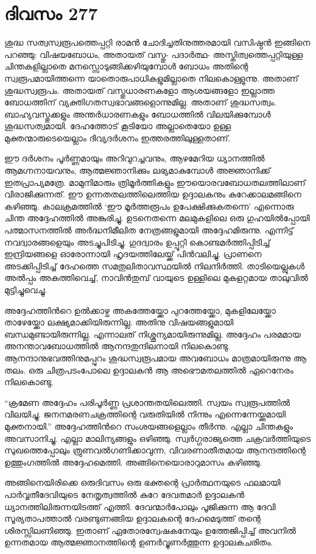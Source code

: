 \section{ദിവസം 277}


ശുദ്ധ സത്വസ്വരൂപത്തെപ്പറ്റി രാമന്‍ ചോദിച്ചതിനുത്തരമായി വസിഷ്ഠന്‍ ഇങ്ങിനെ പറഞ്ഞു: വിഷയബോധം, അതായത് വസ്തു- പദാര്‍ത്ഥ- അസ്തിത്വത്തെപ്പറ്റിയുള്ള ചിന്തകളില്ലാതെ മനസ്സൊടുങ്ങിക്കഴിയുമ്പോള്‍ ബോധം അതിന്റെ സ്വരൂപമായിത്തന്നെ യാതൊരുപാധികളുമില്ലാതെ നിലകൊള്ളുന്നു. അതാണ്‌ ശുദ്ധസ്വരൂപം. അതായത് വസ്തുധാരണകളോ ആശയങ്ങളോ ഇല്ലാത്ത ബോധത്തിന് വ്യക്തിഗതസ്വഭാവങ്ങളൊന്നുമില്ല. അതാണ്‌ ശുദ്ധസത്വം.  ബാഹ്യവസ്തുക്കളും അന്തര്‍ധാരണകളും ബോധത്തില്‍ വിലയിക്കുമ്പോള്‍ ശുദ്ധസത്വമായി. ദേഹത്തോട് കൂടിയോ അല്ലാതെയോ ഉള്ള മുക്തന്മാരുടെയെല്ലാം ദിവ്യദര്‍ശനം ഇത്തരത്തിലുള്ളതാണ്.   

ഈ ദര്‍ശനം പൂര്‍ണ്ണമായും അറിവുറച്ചവനും, ആഴമേറിയ ധ്യാനത്തില്‍ ആമഗ്നനായവനും, ആത്മജ്ഞാനിക്കും ലഭ്യമാകുമ്പോള്‍ അജ്ഞാനിക്ക് ഇതപ്രാപ്യമത്രേ. മാമുനിമാരും ത്രിമൂര്‍ത്തികളും ഈയൊരവബോധതലത്തിലാണ് വിരാജിക്കുന്നത്. ഈ ഉന്നതതലത്തിലെത്തിയ ഉദ്ദാലകനും കുറേക്കാലമങ്ങിനെ കഴിഞ്ഞു. കാലക്രമത്തില്‍ ‘ഈ മൂര്‍ത്തരൂപം ഉപേക്ഷിക്കുകതന്നെ’ എന്നൊരു ചിന്ത അദ്ദേഹത്തില്‍ അങ്കുരിച്ചു. ഉടനെതന്നെ മലമുകളിലെ ഒരു ഗുഹയില്‍പ്പോയി പത്മാസനത്തില്‍ അര്‍ദ്ധനിമീലിത നേത്രങ്ങളുമായി അദ്ദേഹമിരുന്നു. എന്നിട്ട് നവദ്വാരങ്ങളെയും അടച്ചുപിടിച്ചു. ഗുദദ്വാരം ഉപ്പൂറ്റി കൊണ്ടമര്‍ത്തിപ്പിടിച്ച് ഇന്ദ്രിയങ്ങളെ ഓരോന്നായി ഹൃദയത്തിലേയ്ക്ക് പിന്‍വലിച്ചു. പ്രാണനെ അടക്കിപ്പിടിച്ച് ദേഹത്തെ സമതുലിതാവസ്ഥയില്‍ നിലനിര്‍ത്തി. താടിയെല്ലുകള്‍ അല്‍പ്പം അകത്തിവെച്ച്, നാവിന്‍തുമ്പ് വായുടെ ഉള്ളിലെ മുകളറ്റമായ താലുവില്‍ മുട്ടിച്ചുവെച്ചു.  

അദ്ദേഹത്തിന്‍റെ ഉല്‍ക്കാഴ്ച അകത്തേയ്ക്കോ പുറത്തേയ്ക്കോ, മുകളിലേയ്ക്കോ താഴേയ്ക്കോ ലക്ഷ്യമാക്കിയിരുന്നില്ല. അതിനു വിഷയങ്ങളുമായി ബന്ധമുണ്ടായിരുന്നില്ല. എന്നാലത് നിശ്ശൂന്യമായിരുന്നുമില്ല. അദ്ദേഹം പരമമായ അനന്താവബോധത്തില്‍ ആനന്ദതുന്ദിലനായി നിലകൊണ്ടു. ആനന്ദാനുഭവത്തിനുമപ്പുറം ശുദ്ധസ്വരൂപമായ അവബോധം മാത്രമായിരുന്നു ആ തലം. ഒരു ചിത്രപടംപോലെ ഉദ്ദാലകന്‍ ആ അഭൌമതലത്തില്‍ ഏറെനേരം നിലകൊണ്ടു.

 “ക്രമേണ അദ്ദേഹം പരിപൂര്‍ണ്ണ പ്രശാന്തതയിലെത്തി. സ്വയം സ്വരൂപത്തില്‍ വിലയിച്ചു. ജനനമരണചക്രത്തിന്റെ വരുതിയില്‍ നിന്നും എന്നെന്നേയ്ക്കുമായി മുക്തനായി.” അദ്ദേഹത്തിന്‍റെ സംശയങ്ങളെല്ലാം തീര്‍ന്നു. എല്ലാ ചിന്തകളും അവസാനിച്ചു. എല്ലാ മാലിന്യങ്ങളും ഒഴിഞ്ഞു. സ്വര്‍ഗ്ഗരാജ്യത്തെ ചക്രവര്‍ത്തിയുടെ സുഖത്തെപ്പോലും ത്രുണവല്‍ഗണിക്കാവുന്ന, വിവരണാതീതമായ ആനന്ദത്തിന്റെ ഉത്തുംഗത്തില്‍ അദ്ദേഹമെത്തി. അങ്ങിനെയൊരാറുമാസം കഴിഞ്ഞു.

അങ്ങിനെയിരിക്കെ ഒരുദിവസം ഒരു ഭക്തന്റെ പ്രാര്‍ത്ഥനയുടെ ഫലമായി പാര്‍വ്വതീദേവിയുടെ നേതൃത്വത്തില്‍ കുറേ ദേവതമാര്‍ ഉദ്ദാലകന്‍ ധ്യാനത്തിലിരുന്നയിടത്ത് എത്തി. ദേവന്മാര്‍പോലും പൂജിക്കുന്ന ആ ദേവി സൂര്യതാപത്താല്‍ വരണ്ടുണങ്ങിയ ഉദ്ദാലകന്റെ ദേഹമെടുത്ത് തന്റെ  ശിരസ്സിലണിഞ്ഞു. ഇതാണ്‌ ഏതോരന്വേഷകനേയും ഉത്തേജിപ്പിച്ച് അവനില്‍ ഉന്നതമായ ആത്മജ്ഞാനത്തിന്റെ ഉണര്‍വ്വുണര്‍ത്തുന്ന ഉദ്ദാലകചരിതം.

